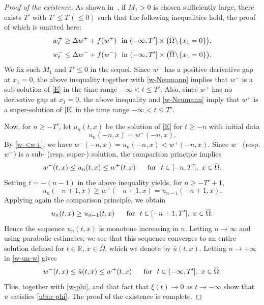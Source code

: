 \documentclass[a4paper,12pt,fullpage]{article}
\numberwithin{equation}{section}
\def\R{{\mathbb R}}
\begin{document}
\begin{proof}[Proof of the existence]
As shown in~\cite[Lemma~2.2]{BHM1}, if $M_1>0$ is chosen sufficiently large, there exists $T'$ with $T'\le T\,(\le 0)$ such that the following inequalities hold, the proof of which is omitted here:
\[
w^+_t\ge\Delta w^++f(w^+)\ \hbox{ in }(-\infty,T']\times\big(\overline{\Omega}\!\setminus\!\{x_1=0\}\big),
\]
\[
w^-_t\le\Delta w^-+f(w^-)\ \hbox{ in }(-\infty,T']\times\big(\overline{\Omega}\!\setminus\!\{x_1=0\}\big).
\]
We fix such $M_1$ and $T'\le0$ in the sequel. Since $w^-$ has a positive derivative gap at $x_1=0$, the above inequality together with \eqref{w-Neumann} implies that $w^-$ is a sub-solution of \eqref{E} in the time range $-\infty<t\leq T'$. Also, since $w^{+}$ has no derivative gap at $x_1=0$, the above inequality and \eqref{w-Neumann} imply that $w^+$ is a super-solution of \eqref{E} in the time range $-\infty<t\leq T'$. 

Now, for $n\ge-T'$, let $u_n(t,x)$ be the solution of \eqref{E} for $t\geq -n$ with initial data
\begin{equation}\label{un}
 u_n(-n,x)=w^-(-n,x).
\end{equation}
By \eqref{w-<w+}, we have $w^-(-n,x)=u_n(-n,x)<w^+(-n,x)$. Since $w^-$ (resp. $w^+$) is a sub- (resp. super-) solution, the comparison principle implies
\begin{equation}\label{w-un-w}
w^-(t,x)\leq u_n(t,x)\leq w^+(t,x)\quad\ \ \hbox{for}\ \ t\in[-n,T'],\ x\in\overline{\Omega}.
\end{equation}
Setting $t=-(n-1)$ in the above inequality yields, for $n\ge-T'+1$,
\[
u_{n}(-n+1,x)\geq w^-(-n+1,x)=u_{n-1}(-n+1,x).
\]
Applying again the comparison principle, we obtain
\begin{equation*}\label{un-monotone}
u_{n}(t,x)\geq u_{n-1}(t,x)\quad\ \ \hbox{for}\ \ t\in[-n+1,T'],\ x\in\overline{\Omega}.
\end{equation*}
Hence the sequence $u_n(t,x)$ is monotone increasing in $n$. Letting $n\to\infty$ and using parabolic estimates, we see that this sequence converges to an entire solution defined for $t\in\R,\,x\in\overline{\Omega}$, which we denote by $\bar u(t,x)$. Letting $n\to+\infty$ in \eqref{w-un-w} gives
\begin{equation*}\label{w-u-w}
w^-(t,x)\leq \bar u(t,x)\leq w^+(t,x)\quad\ \ \hbox{for}\ \
t\in(-\infty,T'],\ x\in\overline{\Omega}.
\end{equation*}
This, together with \eqref{w-phi}, and that fact that $\xi(t)\to 0$ as $t\to-\infty$ show that $\bar{u}$ satisfies \eqref{ubar-phi}. The proof of the existence is complete.
\end{proof}
\end{document}
